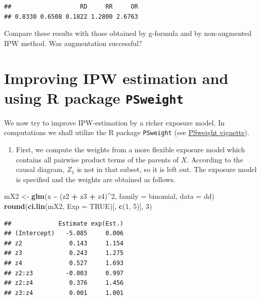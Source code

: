 \documentclass[
]{book}
\newenvironment{Shaded}{\begin{snugshade}}{\end{snugshade}}
\newcommand{\AttributeTok}[1]{\textcolor[rgb]{0.13,0.29,0.53}{#1}}
\newcommand{\ConstantTok}[1]{\textcolor[rgb]{0.56,0.35,0.01}{#1}}
\newcommand{\DecValTok}[1]{\textcolor[rgb]{0.00,0.00,0.81}{#1}}
\newcommand{\FunctionTok}[1]{\textcolor[rgb]{0.13,0.29,0.53}{\textbf{#1}}}
\newcommand{\NormalTok}[1]{#1}
\newcommand{\OtherTok}[1]{\textcolor[rgb]{0.56,0.35,0.01}{#1}}
\newcommand{\SpecialCharTok}[1]{\textcolor[rgb]{0.81,0.36,0.00}{\textbf{#1}}}
\providecommand{\tightlist}{%
  \setlength{\itemsep}{0pt}\setlength{\parskip}{0pt}}
\begin{document}
\begin{verbatim}
##                   RD     RR     OR 
## 0.8330 0.6508 0.1822 1.2800 2.6763
\end{verbatim}

Compare these results with those obtained by g-formula and by
non-augmented IPW method.
Was augmentation successful?

\section{\texorpdfstring{Improving IPW estimation and using R package \texttt{PSweight}}{Improving IPW estimation and using R package PSweight}}\label{improving-ipw-estimation-and-using-r-package-psweight}

We now try to improve IPW-estimation by a richer exposure model.
In computations we shall utilize the R package \texttt{PSweight}
(see \href{https://cran.r-project.org/web/packages/PSweight/vignettes/vignette.pdf}{PSweight vignette}).

\begin{enumerate}
\def\labelenumi{\arabic{enumi}.}
\tightlist
\item
  First, we compute the weights from a more flexible exposure model which
  contains all pairwise product terms of the parents of \(X\).
  According to the causal diagram, \(Z_1\) is not in that subset, so it is left out.
  The exposure model is specified and the weights are obtained as follows.
\end{enumerate}

\begin{Shaded}
\begin{Highlighting}[]
\NormalTok{mX2 }\OtherTok{\textless{}{-}} \FunctionTok{glm}\NormalTok{(x }\SpecialCharTok{\textasciitilde{}}\NormalTok{ (z2 }\SpecialCharTok{+}\NormalTok{ z3 }\SpecialCharTok{+}\NormalTok{ z4)}\SpecialCharTok{\^{}}\DecValTok{2}\NormalTok{, }\AttributeTok{family =}\NormalTok{ binomial, }\AttributeTok{data =}\NormalTok{ dd)}
\FunctionTok{round}\NormalTok{(}\FunctionTok{ci.lin}\NormalTok{(mX2, }\AttributeTok{Exp =} \ConstantTok{TRUE}\NormalTok{)[, }\FunctionTok{c}\NormalTok{(}\DecValTok{1}\NormalTok{, }\DecValTok{5}\NormalTok{)], }\DecValTok{3}\NormalTok{)}
\end{Highlighting}
\end{Shaded}

\begin{verbatim}
##             Estimate exp(Est.)
## (Intercept)   -5.085     0.006
## z2             0.143     1.154
## z3             0.243     1.275
## z4             0.527     1.693
## z2:z3         -0.003     0.997
## z2:z4          0.376     1.456
## z3:z4          0.001     1.001
\end{verbatim}
\end{document}
